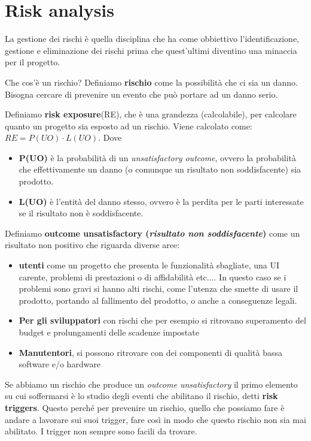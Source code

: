 \section{Risk analysis}

La gestione dei rischi è quella disciplina che ha come obbiettivo l'identificazione, gestione e eliminazione dei rischi prima che quest'ultimi diventino una minaccia per il progetto. 

Che cos'è un rischio? Definiamo \textbf{rischio} come la possibilità che ci sia un danno. Bisogna cercare di prevenire un evento che può portare ad un danno serio. 

Definiamo \textbf{risk exposure}(RE), che è una grandezza (calcolabile), per calcolare quanto un progetto sia esposto ad un rischio. Viene calcolato come: 
$RE = P(UO) \cdot L(UO)$. Dove \begin{itemize}
    \item \textbf{P(UO)} è la probabilità di un \textit{unsatisfactory outcome}, ovvero la probabilità che effettivamente un danno (o comunque un risultato non soddisfacente) sia prodotto.
    \item \textbf{L(UO)} è l'entità del danno stesso, ovvero è la perdita per le parti interessate se il risultato non è soddisfacente.
    \end{itemize}
    
Definiamo \textbf{outcome unsatisfactory (\textit{risultato non soddisfacente})} come un risultato non positivo che riguarda diverse aree:
\begin{itemize}
    \item \textbf{utenti} come un progetto che presenta le funzionalità sbagliate, una UI carente, problemi di prestazioni o di affidabilità etc$\ldots$. In questo caso se i problemi sono gravi si hanno alti rischi, come l'utenza che smette di usare il prodotto, portando al fallimento del prodotto, o anche a conseguenze legali.
    \item \textbf{Per gli sviluppatori} con rischi che per esempio si ritrovano superamento del budget e prolungamenti delle scadenze impostate
    \item \textbf{Manutentori}, si possono ritrovare con dei componenti di qualità bassa software e/o hardware
\end{itemize}

Se abbiamo un rischio che produce un \textit{outcome unsatisfactory} il primo elemento su cui soffermarsi è lo studio degli eventi che abilitano il rischio, detti \textbf{risk triggers}. Questo perché per prevenire un rischio, quello che possiamo fare è andare a lavorare sui suoi trigger, fare così in modo che questo rischio non sia mai abilitato. I trigger non sempre sono facili da trovare. 

